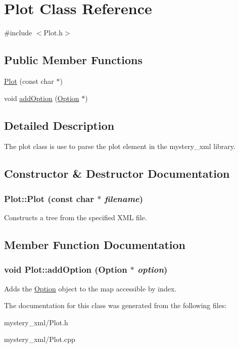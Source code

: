 \hypertarget{classPlot}{
\section{Plot Class Reference}
\label{classPlot}
}


{\ttfamily \#include $<$Plot.h$>$}\subsection*{Public Member Functions}
\begin{DoxyCompactItemize}
\item 
\hyperlink{classPlot_a836271d0487e811f66768dadb44e4548}{Plot} (const char $\ast$)
\item 
void \hyperlink{classPlot_abdaa02f5857205d8eda001462be0d9f7}{addOption} (\hyperlink{classOption}{Option} $\ast$)
\end{DoxyCompactItemize}


\subsection{Detailed Description}
The plot class is use to parse the plot element in the mystery\_\-xml library. 

\subsection{Constructor \& Destructor Documentation}
\hypertarget{classPlot_a836271d0487e811f66768dadb44e4548}{
\subsubsection[{Plot}]{\setlength{\rightskip}{0pt plus 5cm}Plot::Plot (const char $\ast$ {\em filename})}}
\label{classPlot_a836271d0487e811f66768dadb44e4548}
Constructs a tree from the specified XML file. 

\subsection{Member Function Documentation}
\hypertarget{classPlot_abdaa02f5857205d8eda001462be0d9f7}{
\subsubsection[{addOption}]{\setlength{\rightskip}{0pt plus 5cm}void Plot::addOption ({\bf Option} $\ast$ {\em option})}}
\label{classPlot_abdaa02f5857205d8eda001462be0d9f7}
Adds the \hyperlink{classOption}{Option} object to the map accessible by index. 

The documentation for this class was generated from the following files:\begin{DoxyCompactItemize}
\item 
mystery\_\-xml/Plot.h\item 
mystery\_\-xml/Plot.cpp\end{DoxyCompactItemize}
